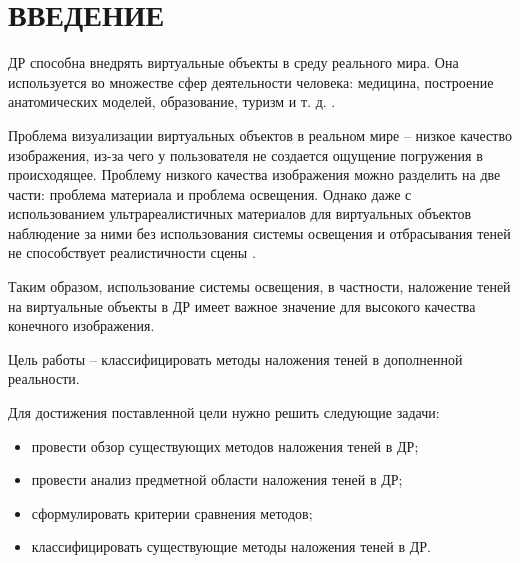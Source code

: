\chapter*{ВВЕДЕНИЕ}

ДР способна внедрять виртуальные объекты в среду реального мира. Она используется во множестве сфер деятельности человека: медицина, построение анатомических моделей, образование, туризм и т. д. \cite{tech-ar}.

Проблема визуализации виртуальных объектов в реальном мире -- низкое качество изображения, из-за чего у пользователя не создается ощущение погружения в происходящее. Проблему низкого качества изображения можно разделить на две части: проблема материала и проблема освещения. Однако даже с использованием ультрареалистичных материалов для виртуальных объектов наблюдение за ними без использования системы освещения и отбрасывания теней не способствует реалистичности сцены \cite{osti2019real}.

Таким образом, использование системы освещения, в частности, наложение теней на виртуальные объекты в ДР имеет важное значение для высокого качества конечного изображения.

Цель работы -- классифицировать методы наложения теней в дополненной реальности.

Для достижения поставленной цели нужно решить следующие задачи:

\begin{itemize}
	\item провести обзор существующих методов наложения теней в ДР;
	\item провести анализ предметной области наложения теней в ДР;
	\item сформулировать критерии сравнения методов;
	\item классифицировать существующие методы наложения теней в ДР.
\end{itemize}